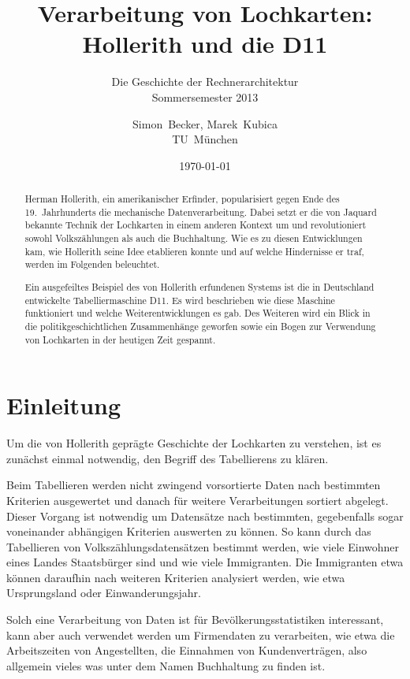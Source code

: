 \documentclass[parskip=half]{scrartcl}
\author{Simon~Becker, Marek~Kubica\\TU~München}
\title{Verarbeitung von Lochkarten: Hollerith und die D11}
\subtitle{Die Geschichte der Rechnerarchitektur\\
Sommersemester 2013}
\date{\today}
\begin{document}
\maketitle

\begin{abstract}

Herman Hollerith, ein amerikanischer Erfinder, popularisiert gegen Ende des
19.~Jahrhunderts die mechanische Datenverarbeitung. Dabei setzt er die von
Jaquard bekannte Technik der Lochkarten in einem anderen Kontext um und
revolutioniert sowohl Volkszählungen als auch die Buchhaltung. Wie es zu diesen
Entwicklungen kam, wie Hollerith seine Idee etablieren konnte und auf welche
Hindernisse er traf, werden im Folgenden beleuchtet.

Ein ausgefeiltes Beispiel des von Hollerith erfundenen Systems ist die in
Deutschland entwickelte Tabelliermaschine D11. Es wird beschrieben wie diese
Maschine funktioniert und welche Weiterentwicklungen es gab.  Des Weiteren wird
ein Blick in die politikgeschichtlichen Zusammenhänge geworfen sowie ein Bogen
zur Verwendung von Lochkarten in der heutigen Zeit gespannt.

\end{abstract}

\tableofcontents

\section{Einleitung}
\label{sec:einleitung}

Um die von Hollerith geprägte Geschichte der Lochkarten zu verstehen, ist es
zunächst einmal notwendig, den Begriff des Tabellierens zu klären.

Beim Tabellieren werden nicht zwingend vorsortierte Daten nach bestimmten
Kriterien ausgewertet und danach für weitere Verarbeitungen sortiert abgelegt.
Dieser Vorgang ist notwendig um Datensätze nach bestimmten, gegebenfalls sogar
voneinander abhängigen Kriterien auswerten zu können. So kann durch das
Tabellieren von Volkszählungsdatensätzen bestimmt werden, wie viele Einwohner
eines Landes Staatsbürger sind und wie viele Immigranten. Die Immigranten etwa
können daraufhin nach weiteren Kriterien analysiert werden, wie etwa
Ursprungsland oder Einwanderungsjahr.

Solch eine Verarbeitung von Daten ist für Bevölkerungsstatistiken interessant,
kann aber auch verwendet werden um Firmendaten zu verarbeiten, wie etwa die
Arbeitszeiten von Angestellten, die Einnahmen von Kundenverträgen, also
allgemein vieles was unter dem Namen Buchhaltung zu finden ist.
\end{document}
